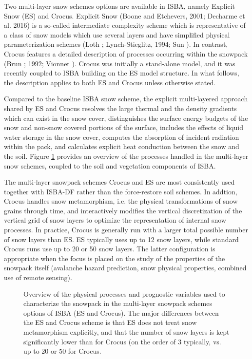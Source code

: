 Two multi-layer snow schemes options are available in ISBA, namely Explicit Snow (ES)
and Crocus. Explicit Snow (Boone and Etchevers,
2001\nocite{Boone2001}; Decharme et al. 2016) is a so-called intermediate complexity scheme which
is representative of a class of snow models which
use several layers and have simplified physical parameterization
schemes (Loth \nocite{Loth1993}; Lynch-Stieglitz, 1994\nocite{Lynch-Stieglitz1994}; Sun \nocite{Sun1999}).
In contrast, Crocus features a detailed description of processes
occurring within the snowpack (Brun ; 1992\nocite{brun1989,brun1992}; Vionnet \nocite{Vionnet2012}).
Crocus was initially a stand-alone model, and it was recently coupled to ISBA building on the ES model structure. 
In what follows, the description 
applies to both ES and Crocus unless otherwise stated.


Compared to the baseline ISBA snow scheme,
the explicit multi-layered approach shared by ES and Crocus 
resolves the large thermal and the density gradients
which can exist in the snow cover, distinguishes the surface
energy budgets of the snow and non-snow covered portions
of the surface, includes the effects of liquid water storage
in the snow cover, computes the
absorption of incident radiation within the pack,
and calculates explicit heat conduction between the
snow and the soil. Figure \ref{fig:schema-crocus} provides an overview
of the processes handled in the multi-layer snow schemes, coupled to
the soil and vegetation components of ISBA. 

The multi-layer snowpack schemes Crocus and ES are most consistently
used together with ISBA-DF rather than the force-restore soil
schemes. In addtion, Crocus handles snow metamorphism, i.e. the
physical transformations of snow grains through time, and
interactively modifies the vertical discretization of the vertical
grid of snow layers to optimize the representation of internal snow
processes. In practice, Crocus is generally run with a larger total
possible number of snow layers than ES. ES typically uses up to 12
snow layers, while standard Crocus runs use up to 20 or 50 snow
layers. The latter configuration is appropriate when the focus is
placed on the study of the properties of the snowpack itself
(avalanche hazard prediction, snow physical properties, combined use
of remote sensing).

\begin{figure}[h!]
\begin{center}
\caption{Overview of the physical processes and prognostic variables
  used to characterize the snowpack in the multi-layer snowpack
  schemes options of ISBA (ES and Crocus). The  major differences
  between the ES and Crocus scheme is that ES does not treat snow
  metamorphism explicitly, and that the number of snow layers is kept
  significantly lower than for Crocus (on the order of 3 typically,
  vs. up to 20 or 50 for Crocus. \label{fig:schema-crocus}}
\end{center}
\end{figure}

